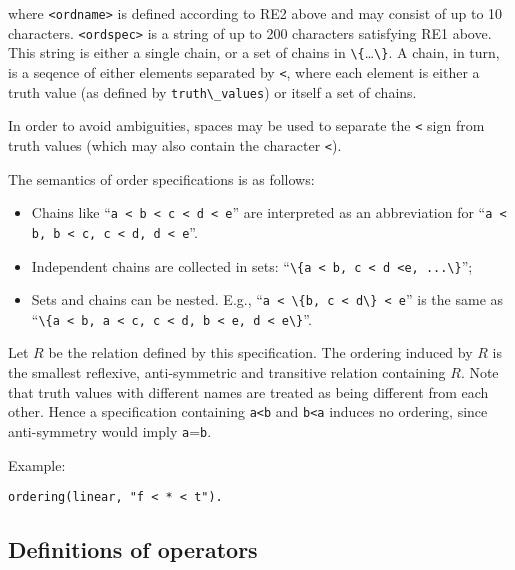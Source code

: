 \documentclass[
]{article}
\newcommand{\passthrough}[1]{#1}
\providecommand{\tightlist}{%
  \setlength{\itemsep}{0pt}\setlength{\parskip}{0pt}}
\begin{document}
where \passthrough{\lstinline!<ordname>!} is defined according to RE2
above and may consist of up to 10 characters.
\passthrough{\lstinline!<ordspec>!} is a string of up to 200 characters
satisfying RE1 above. This string is either a single chain, or a set of
chains in
\passthrough{\lstinline!\{!}\ldots{}\passthrough{\lstinline!\}!}. A
chain, in turn, is a seqence of either elements separated by
\passthrough{\lstinline!<!}, where each element is either a truth value
(as defined by \passthrough{\lstinline!truth\_values!}) or itself a set
of chains.

In order to avoid ambiguities, spaces may be used to separate the
\passthrough{\lstinline!<!} sign from truth values (which may also
contain the character \passthrough{\lstinline!<!}).

The semantics of order specifications is as follows:

\begin{itemize}
\tightlist
\item
  Chains like ``\passthrough{\lstinline!a < b < c < d < e!}'' are
  interpreted as an abbreviation for
  ``\passthrough{\lstinline!a < b, b < c, c < d, d < e!}''.
\item
  Independent chains are collected in sets:
  ``\passthrough{\lstinline!\{a < b, c < d <e, ...\}!}'';
\item
  Sets and chains can be nested. E.g.,
  ``\passthrough{\lstinline!a < \{b, c < d\} < e!}'' is the same as
  ``\passthrough{\lstinline!\{a < b, a < c, c < d, b < e, d < e\}!}''.
\end{itemize}

Let \(R\) be the relation defined by this specification. The ordering
induced by \(R\) is the smallest reflexive, anti-symmetric and
transitive relation containing \(R\). Note that truth values with
different names are treated as being different from each other. Hence a
specification containing \passthrough{\lstinline!a<b!} and
\passthrough{\lstinline!b<a!} induces no ordering, since anti-symmetry
would imply \passthrough{\lstinline!a!}=\passthrough{\lstinline!b!}.

Example:

\begin{lstlisting}
ordering(linear, "f < * < t").
\end{lstlisting}

\hypertarget{definitions-of-operators}{%
\subsection{Definitions of operators}\label{definitions-of-operators}}
\end{document}
